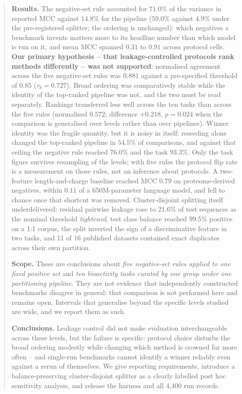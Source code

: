 \documentclass[11pt,a4paper]{article}
\begin{document}
\begin{abstract}
\noindent\textbf{Results.} The negative-set rule accounted for $71.0\%$ of the variance in
reported MCC against $14.8\%$ for the pipeline ($59.0\%$ against $4.9\%$ under the
pre-registered splitter; the ordering is unchanged): which negatives a benchmark invents
matters more to its headline number than which model is run on it, and mean MCC spanned
$0.31$ to $0.91$ across protocol cells. \textbf{Our primary hypothesis -- that leakage-controlled
protocols rank methods differently -- was not supported}: normalised agreement across the
five negative-set rules was $0.881$ against a pre-specified threshold of $0.85$
($\tau_b = 0.727$). Broad ordering was comparatively stable while the identity of the
top-ranked pipeline was not, and the two must be read separately. Rankings transferred
less well across the ten tasks than across the five rules (normalised $0.572$; difference
${+}0.218$, $p = 0.024$ when the comparison is generalised over levels rather than over
pipelines). Winner identity was the fragile quantity, but it is noisy in itself: reseeding
alone changed the top-ranked pipeline in $54.5\%$ of comparisons, and against that ceiling
the negative rule reached $76.0\%$ and the task $93.3\%$. Only the task figure survives
resampling of the levels; with five rules the protocol flip rate is a measurement on those
rules, not an inference about protocols. A two-feature length-and-charge
baseline reached MCC $0.79$ on proteome-derived negatives, within $0.11$ of a
650M-parameter language model, and fell to chance once that shortcut was removed.
Cluster-disjoint splitting itself underdelivered: residual pairwise leakage rose to
$21.6\%$ of test sequences as the nominal threshold \emph{tightened}, test class balance
reached $99.5\%$ positive on a 1:1 corpus, the split inverted the sign of a discriminative
feature in two tasks, and 11 of 16 published datasets contained exact duplicates across
their own partition.

\noindent\textbf{Scope.} These are conclusions about \emph{five negative-set rules applied
to one fixed positive set} and \emph{ten bioactivity tasks curated by one group under one
partitioning pipeline}. They are not evidence that independently constructed benchmarks
disagree in general: that comparison is not performed here and remains open. Intervals
that generalise beyond the specific levels studied are wide, and we report them as such.

\noindent\textbf{Conclusions.} Leakage control did not make evaluation interchangeable
across these levels, but the failure is specific: protocol choice disturbs the broad
ordering modestly while changing which method is crowned far more often -- and single-run
benchmarks cannot identify a winner reliably even against a rerun of themselves. We give
reporting requirements, introduce a balance-preserving cluster-disjoint splitter as a
clearly labelled post hoc sensitivity analysis, and release the harness and all 4{,}400 run
records.
\end{abstract}
\end{document}
